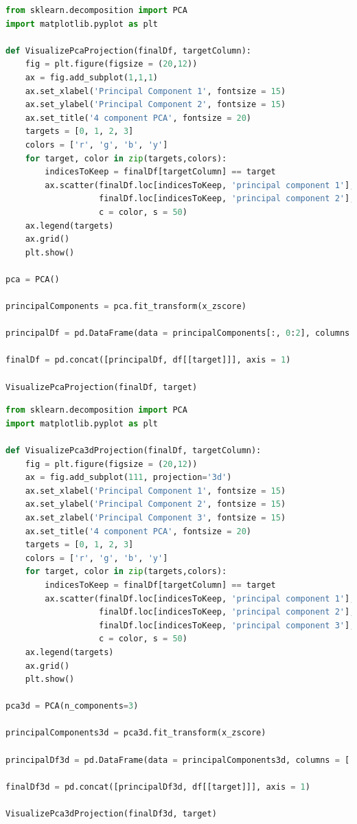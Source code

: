 \documentclass[conference]{IEEEtran}
\begin{document}
\begin{lstlisting}[language=Python]
from sklearn.decomposition import PCA
import matplotlib.pyplot as plt

def VisualizePcaProjection(finalDf, targetColumn):
    fig = plt.figure(figsize = (20,12))
    ax = fig.add_subplot(1,1,1) 
    ax.set_xlabel('Principal Component 1', fontsize = 15)
    ax.set_ylabel('Principal Component 2', fontsize = 15)
    ax.set_title('4 component PCA', fontsize = 20)
    targets = [0, 1, 2, 3]
    colors = ['r', 'g', 'b', 'y']
    for target, color in zip(targets,colors):
        indicesToKeep = finalDf[targetColumn] == target
        ax.scatter(finalDf.loc[indicesToKeep, 'principal component 1'],
                   finalDf.loc[indicesToKeep, 'principal component 2'],
                   c = color, s = 50)
    ax.legend(targets)
    ax.grid()
    plt.show()

pca = PCA()

principalComponents = pca.fit_transform(x_zscore)

principalDf = pd.DataFrame(data = principalComponents[:, 0:2], columns = ['principal component 1', 'principal component 2'])

finalDf = pd.concat([principalDf, df[[target]]], axis = 1)

VisualizePcaProjection(finalDf, target)
\end{lstlisting}

\begin{lstlisting}[language=Python]
from sklearn.decomposition import PCA
import matplotlib.pyplot as plt

def VisualizePca3dProjection(finalDf, targetColumn):
    fig = plt.figure(figsize = (20,12))
    ax = fig.add_subplot(111, projection='3d') 
    ax.set_xlabel('Principal Component 1', fontsize = 15)
    ax.set_ylabel('Principal Component 2', fontsize = 15)
    ax.set_zlabel('Principal Component 3', fontsize = 15)
    ax.set_title('4 component PCA', fontsize = 20)
    targets = [0, 1, 2, 3]
    colors = ['r', 'g', 'b', 'y']
    for target, color in zip(targets,colors):
        indicesToKeep = finalDf[targetColumn] == target
        ax.scatter(finalDf.loc[indicesToKeep, 'principal component 1'],
                   finalDf.loc[indicesToKeep, 'principal component 2'],
                   finalDf.loc[indicesToKeep, 'principal component 3'],
                   c = color, s = 50)
    ax.legend(targets)
    ax.grid()
    plt.show()

pca3d = PCA(n_components=3)

principalComponents3d = pca3d.fit_transform(x_zscore)

principalDf3d = pd.DataFrame(data = principalComponents3d, columns = ['principal component 1', 'principal component 2', 'principal component 3'])

finalDf3d = pd.concat([principalDf3d, df[[target]]], axis = 1)

VisualizePca3dProjection(finalDf3d, target)
\end{lstlisting}
\end{document}

